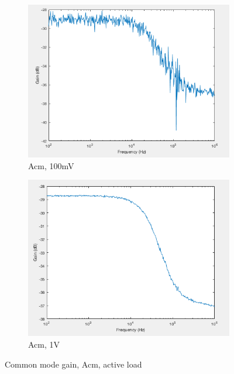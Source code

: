 \begin{figure}[H]
    \centering
    \begin{subfigure}[b]{0.45\textwidth}
        \centering
        \includegraphics[width=\textwidth]{ExperimentalImplementation/Acm_active_100m.png}
        \caption{Acm, 100mV}
        \label{fig:blue_led}
    \end{subfigure}
    \hfill
    \begin{subfigure}[b]{0.45\textwidth}
        \centering
        \includegraphics[width=\textwidth]{ExperimentalImplementation/Acm_active_1v.png}
        \caption{Acm, 1V}
        \label{fig:blue_led}
    \end{subfigure}
    \caption{Common mode gain, Acm, active load}
    \label{fig:Acmactive}
\end{figure} 

